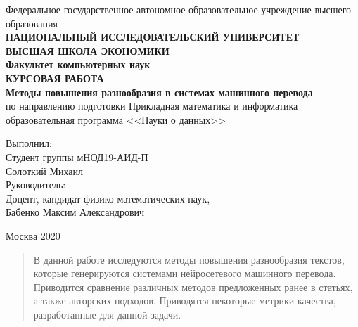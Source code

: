 \documentclass[a4paper, 12pt]{extarticle}
\begin{document}
	\thispagestyle{empty}
	\begin{center}
		Федеральное государственное автономное образовательное учреждение высшего образования
		\\
		\textbf{НАЦИОНАЛЬНЫЙ ИССЛЕДОВАТЕЛЬСКИЙ УНИВЕРСИТЕТ}
		\\
		\textbf{\guillemotleft ВЫСШАЯ ШКОЛА ЭКОНОМИКИ\guillemotright}
		\\[5mm]
		\textbf{Факультет компьютерных наук}
		\\[40mm]
		\textbf{КУРСОВАЯ РАБОТА}
		\\
		\textbf{Методы повышения разнообразия в системах машинного перевода}
		\\[10mm]
		по направлению подготовки Прикладная математика и информатика
		\\
		образовательная программа <<Науки о данных>>
		\\[30mm]
	\end{center}
	\begin{flushright}
		Выполнил:
		\\
		Студент группы мНОД19-АИД-П
		\\
		Солоткий Михаил
		\\[5mm]
		Руководитель:
		\\
		Доцент, кандидат физико-математических наук,
		\\
		Бабенко Максим Александрович
		\\[30mm]
	\end{flushright}
	\vfill
	\begin{center} Москва 2020 \end{center}

\newpage
\renewcommand{\contentsname}{Содержание}
\tableofcontents

\newpage
\begin{abstract}
	В данной работе исследуются методы повышения разнообразия текстов, которые генерируются системами нейросетевого машинного перевода. Приводится сравнение различных методов предложенных ранее в статьях, а также авторских подходов. Приводятся некоторые метрики качества, разработанные для данной задачи.
\end{abstract}
\end{document}
